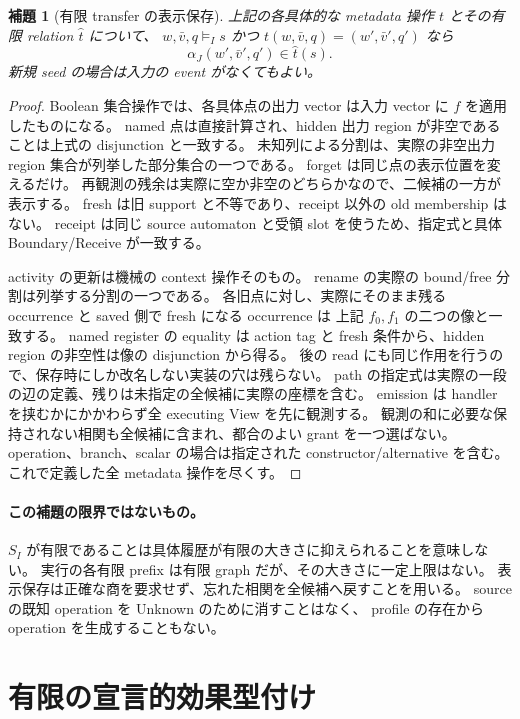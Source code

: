 \documentclass[11pt,a4paper]{article}
\newtheorem{lemma}[definition]{補題}
\begin{document}
\begin{lemma}[有限 transfer の表示保存]
上記の各具体的な metadata 操作 \(t\) とその有限 relation \(\widehat t\) について、
\(w,\bar v,q\models_I s\) かつ \(t(w,\bar v,q)=(w',\bar v',q')\) なら
\[
 \alpha_J(w',\bar v',q')\in\widehat t(s).
\]
新規 seed の場合は入力の event がなくてもよい。
\end{lemma}
\begin{proof}
Boolean 集合操作では、各具体点の出力 vector は入力 vector に \(f\) を適用したものになる。
named 点は直接計算され、hidden 出力 region が非空であることは上式の disjunction と一致する。
未知列による分割は、実際の非空出力 region 集合が列挙した部分集合の一つである。
forget は同じ点の表示位置を変えるだけ。
再観測の残余は実際に空か非空のどちらかなので、二候補の一方が表示する。
fresh は旧 support と不等であり、receipt 以外の old membership はない。
receipt は同じ source automaton と受領 slot を使うため、指定式と具体 Boundary/Receive が一致する。

activity の更新は機械の context 操作そのもの。
rename の実際の bound/free 分割は列挙する分割の一つである。
各旧点に対し、実際にそのまま残る occurrence と saved 側で fresh になる occurrence は
上記 \(f_0,f_1\) の二つの像と一致する。
named register の equality は action tag と fresh 条件から、hidden region の非空性は像の disjunction から得る。
後の read にも同じ作用を行うので、保存時にしか改名しない実装の穴は残らない。
path の指定式は実際の一段の辺の定義、残りは未指定の全候補に実際の座標を含む。
emission は handler を挟むかにかかわらず全 executing View を先に観測する。
観測の和に必要な保持されない相関も全候補に含まれ、都合のよい grant を一つ選ばない。
operation、branch、scalar の場合は指定された constructor/alternative を含む。
これで定義した全 metadata 操作を尽くす。
\end{proof}

\paragraph{この補題の限界ではないもの。}
\(S_I\) が有限であることは具体履歴が有限の大きさに抑えられることを意味しない。
実行の各有限 prefix は有限 graph だが、その大きさに一定上限はない。
表示保存は正確な商を要求せず、忘れた相関を全候補へ戻すことを用いる。
source の既知 operation を Unknown のために消すことはなく、
profile の存在から operation を生成することもない。

\section{有限の宣言的効果型付け}
\label{sec:refined-typing}
\end{document}
